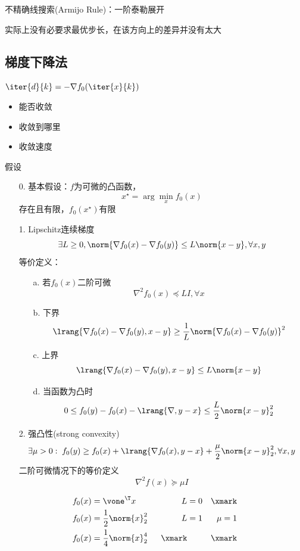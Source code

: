 不精确线搜索(Armijo Rule)：一阶泰勒展开

实际上没有必要求最优步长，在该方向上的差异并没有太大

\subsection{梯度下降法}
$\iter{d}{k}=-\nabla f_0(\iter{x}{k})$
\begin{itemize}
    \item 能否收敛
    \item 收敛到哪里
    \item 收敛速度
\end{itemize}

假设
\begin{itemize}
    \item[0.] 基本假设：$f$为可微的凸函数，
    \[x^\star=\arg\min_x f_0(x)\]
    存在且有限，$f_0(x^\star)$有限
    \item[1.] Lipschitz连续梯度
    \[\exists L\geq 0,\norm{\nabla f_0(x)-\nabla f_0(y)}\leq L\norm{x-y},\forall x,y\]
    等价定义：
    \begin{itemize}
        \item[a.]若$f_0(x)$二阶可微
    \[\nabla^2f_0(x)\preceq LI,\forall x\]
        \item[b.] 下界
    \[\lrang{\nabla f_0(x)-\nabla f_0(y),x-y}\geq\frac{1}{L}\norm{\nabla f_0(x)-\nabla f_0(y)}^2\]
        \item[c.] 上界
    \[\lrang{\nabla f_0(x)-\nabla f_0(y),x-y}\leq L\norm{x-y}\]
        \item[d.] 当函数为凸时
    \[0\leq f_0(y)-f_0(x)-\lrang{\nabla,y-x}\leq\frac{L}{2}\norm{x-y}_2^2\]
    \end{itemize}
    \item[2.] 强凸性(strong convexity)
    \[\exists\mu>0:\;f_0(y)\geq f_0(x)+\lrang{\nabla f_0(x),y-x}+\frac{\mu}{2}\norm{x-y}_2^2,\forall x,y\]
    二阶可微情况下的等价定义
    \[\nabla^2 f(x)\succeq \mu I\]
\end{itemize}
\begin{example}
    \[\begin{aligned}
        f_0(x) &= \vone^\T x\qquad & L &= 0 & \text{\xmark}\\
        f_0(x) &= \frac{1}{2}\norm{x}_2^2 & L &=1 & \mu=1\\
        f_0(x) &= \frac{1}{4}\norm{x}_2^4 & \text{\xmark} & &\text{\xmark}
    \end{aligned}\]
\end{example}

